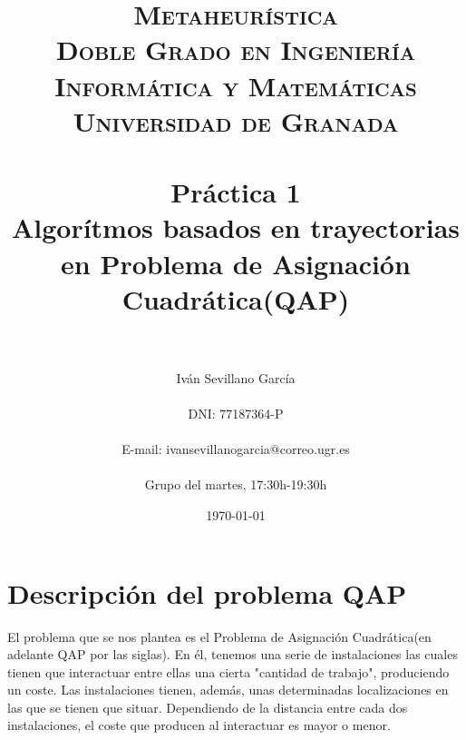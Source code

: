 


\title{	
\normalfont \normalsize 
\textsc{\textbf{Metaheurística} \\ Doble Grado en Ingeniería Informática y Matemáticas \\ Universidad de Granada} \\ [25pt] %
\horrule{0.5pt} \\[0.4cm] %
\Huge Práctica 1\\
\LARGE Algorítmos basados en trayectorias en Problema de Asignación Cuadrática(QAP)
 \\ %
\horrule{2pt} \\[0.5cm] %
}

\author{ Iván Sevillano García \\\\
	DNI: 77187364-P\\ \\
	E-mail: ivansevillanogarcia@correo.ugr.es\\\\
	Grupo del martes, 17:30h-19:30h
	} %

\date{\normalsize\today} %




\maketitle %

\newpage

\tableofcontents
\newpage

\section{Descripción del problema QAP}

El problema que se nos plantea es el Problema de Asignación Cuadrática(en adelante QAP por las siglas). En él, tenemos una serie de instalaciones las cuales tienen que interactuar entre ellas una cierta "cantidad de trabajo", produciendo un coste. Las instalaciones tienen, además, unas determinadas localizaciones en las que se tienen que situar. Dependiendo de la distancia entre cada dos instalaciones, el coste que producen al interactuar es mayor o menor.\\

